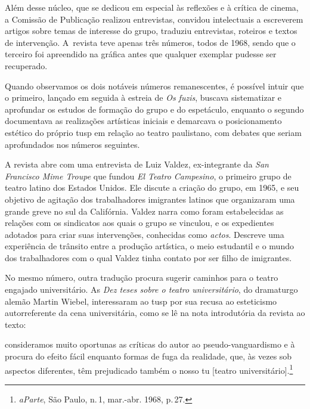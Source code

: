 Além desse núcleo, que se dedicou em especial às reflexões e à crítica
de cinema, a Comissão de Publicação realizou entrevistas, convidou
intelectuais a escreverem artigos sobre temas de interesse do grupo,
traduziu entrevistas, roteiros e textos de intervenção. A~revista teve
apenas três números, todos de 1968, sendo que o terceiro foi apreendido
na gráfica antes que qualquer exemplar pudesse ser recuperado.


Quando observamos os dois notáveis números remanescentes, é possível
intuir que o primeiro, lançado em seguida à estreia de {\it Os fuzis},
buscava sistematizar e aprofundar os estudos de formação do grupo e do
espetáculo, enquanto o segundo documentava as realizações
artísticas iniciais e demarcava o posicionamento estético do próprio {\sc tusp} em
relação ao teatro paulistano, com debates que seriam aprofundados nos
números seguintes.

A revista abre com uma entrevista de Luiz Valdez, ex-integrante da {\it San
Francisco Mime Troupe} que fundou {\it El Teatro Campesino}, o primeiro
grupo de teatro latino dos Estados Unidos. Ele discute a criação do
grupo, em 1965, e seu objetivo de agitação dos trabalhadores imigrantes
latinos que organizaram uma grande greve no sul da Califórnia. Valdez
narra como foram estabelecidas as relações com os sindicatos aos quais o
grupo se vinculou, e os expedientes adotados para criar suas
intervenções, conhecidas como {\it actos}. Descreve uma experiência de
trânsito entre a produção artística, o meio estudantil e o mundo dos
trabalhadores com o qual Valdez tinha contato por ser filho de
imigrantes.

No mesmo número, outra tradução procura sugerir caminhos para o teatro
engajado universitário. As {\it Dez teses sobre o teatro universitário},
do dramaturgo alemão Martin Wiebel, interessaram ao {\sc tusp} por sua recusa
ao esteticismo autorreferente da cena universitária, como se lê na nota
introdutória da revista ao texto:

\startblockquote
consideramos muito oportunas as críticas do autor ao pseudo-vanguardismo
e à procura do efeito fácil enquanto formas de fuga da realidade, que,
às vezes sob aspectos diferentes, têm prejudicado também o nosso {\sc tu}
{[}teatro universitário{]}.\footnote{{\it aParte}, São Paulo, n.\,1,
  mar.-abr. 1968, p.\,27.}
\stopblockquote

